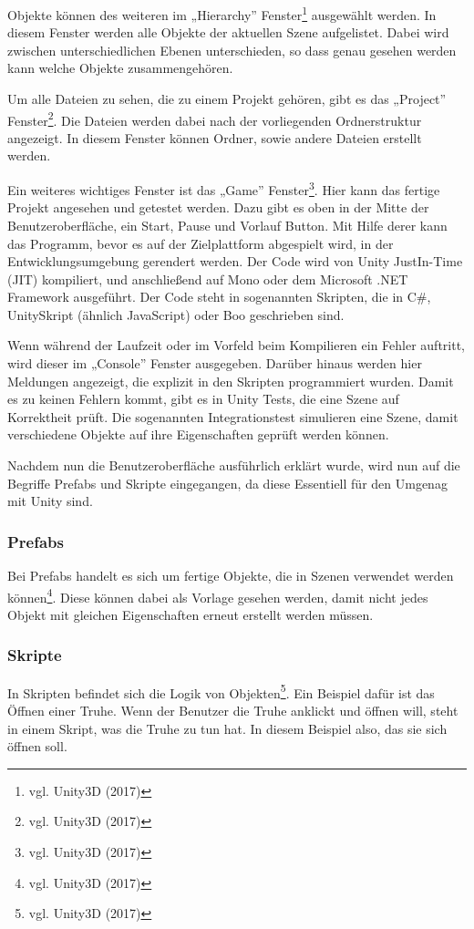 	Objekte können des weiteren im „Hierarchy” Fenster\footnote{vgl. Unity3D \cite{unity4} (2017)} ausgewählt werden. In diesem Fenster werden alle Objekte der aktuellen Szene aufgelistet. Dabei wird zwischen unterschiedlichen Ebenen unterschieden, so dass genau gesehen werden kann welche Objekte zusammengehören. 

	Um alle Dateien zu sehen, die zu einem Projekt gehören, gibt es das „Project” Fenster\footnote{vgl. Unity3D \cite{unity5} (2017)}. Die Dateien werden dabei nach der vorliegenden Ordnerstruktur angezeigt. In diesem Fenster können Ordner, sowie andere Dateien erstellt werden.

	Ein weiteres wichtiges Fenster ist das „Game” Fenster\footnote{vgl. Unity3D \cite{unity6} (2017)}. Hier kann das fertige Projekt angesehen und getestet werden. Dazu gibt es oben in der Mitte der Benutzeroberfläche, ein Start, Pause und Vorlauf Button. Mit Hilfe derer kann das Programm, bevor es auf der Zielplattform abgespielt wird, in der Entwicklungsumgebung gerendert werden. Der Code wird von Unity JustIn-Time (JIT) kompiliert, und anschließend auf Mono oder dem Microsoft .NET Framework ausgeführt. Der Code steht in sogenannten Skripten, die in C\#, UnitySkript (ähnlich JavaScript) oder Boo geschrieben sind.

	Wenn während der Laufzeit oder im Vorfeld beim Kompilieren ein Fehler auftritt, wird dieser im „Console” Fenster ausgegeben. Darüber hinaus werden hier Meldungen angezeigt, die explizit in den Skripten programmiert wurden. Damit es zu keinen Fehlern kommt, gibt es in Unity Tests, die eine Szene auf Korrektheit prüft. Die sogenannten Integrationstest simulieren eine Szene, damit verschiedene Objekte auf ihre Eigenschaften geprüft werden können. 

	Nachdem nun die Benutzeroberfläche ausführlich erklärt wurde, wird nun auf die Begriffe Prefabs und Skripte eingegangen, da diese Essentiell für den Umgenag mit Unity sind.

	\subsubsection{Prefabs}
		Bei Prefabs handelt es sich um fertige Objekte, die in Szenen verwendet werden können\footnote{vgl. Unity3D \cite{unity7} (2017)}. Diese können dabei als Vorlage gesehen werden, damit nicht jedes Objekt mit gleichen Eigenschaften erneut erstellt werden müssen. 
		
	\subsubsection{Skripte}
		In Skripten befindet sich die Logik von Objekten\footnote{vgl. Unity3D \cite{unity8} (2017)}. Ein Beispiel dafür ist das Öffnen einer Truhe. Wenn der Benutzer die Truhe anklickt und öffnen will, steht in einem Skript, was die Truhe zu tun hat. In diesem Beispiel also, das sie sich öffnen soll. 

